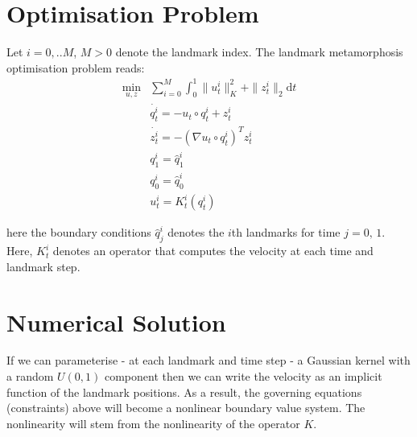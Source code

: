 \documentclass{article}
\newcommand{\norm}[2]{\| #1 \|_{ #2 }}
\newcommand{\knorm}[1]{\norm{ #1 }{K}}
\newcommand{\ltwonorm}[1]{\norm{ #1 }{2}}
\newcommand{\diff}[1]{\text{d} #1}
\begin{document}
\section{Optimisation Problem}

Let $i=0,..M$, $M>0$ denote the landmark index. The landmark metamorphosis 
optimisation problem reads:
\begin{subequations}
\begin{align}
\min_{u, z} & \sum_{i=0}^M \int_0^1 \knorm{u^i_t}^2 + \ltwonorm{z^i_t} \diff{t}\\
            & \dot{q^i_t} = - u_t \circ q^i_t + z^i_t \\
            & \dot{z^i_t} = - (\nabla u_t \circ q^i_t)^T z^i_t \\
            & q^i_1 = \hat q^i_1 \\
            & q^i_0 = \hat q^i_0 \\
            & u^i_t = K^i_t(q^i_t)
\end{align}
\end{subequations}

here the boundary conditions $\hat q^i_j$ denotes the $i$th landmarks for time
$j=0,\,1$. Here, $K^i_t$ denotes an operator that computes the velocity at each time
and landmark step.

\section{Numerical Solution}

If we can parameterise - at each landmark and time step - a Gaussian kernel with
a random $U(0,1)$ component then we can write the velocity as an implicit
function of the landmark positions. As a result, the governing equations
(constraints) above will become a nonlinear boundary value system. The
nonlinearity will stem from the nonlinearity of the operator $K$.



\end{document}
